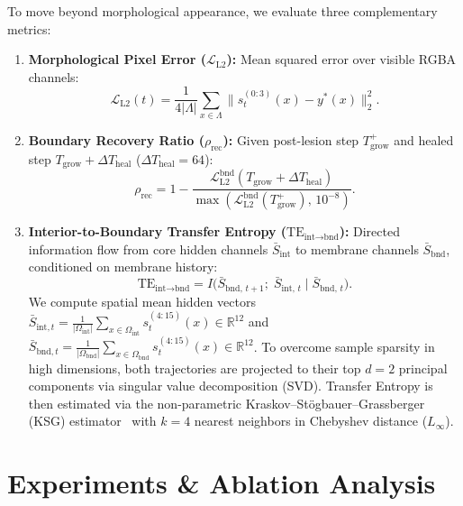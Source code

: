 \documentclass[10pt,twocolumn]{article}
\begin{document}
To move beyond morphological appearance, we evaluate three complementary metrics:
\begin{enumerate}\setlength{\itemsep}{1pt}\setlength{\parskip}{0pt}
    \item \textbf{Morphological Pixel Error ($\mathcal{L}_{\text{L2}}$):} Mean squared error over visible RGBA channels:
    \begin{equation}
    \mathcal{L}_{\text{L2}}(t) = \frac{1}{4 |\Lambda|} \sum_{x \in \Lambda} \| s_t^{(0:3)}(x) - y^*(x) \|_2^2.
    \end{equation}
    \item \textbf{Boundary Recovery Ratio ($\rho_{\text{rec}}$):} Given post-lesion step $T_{\text{grow}}^+$ and healed step $T_{\text{grow}} + \Delta T_{\text{heal}}$ ($\Delta T_{\text{heal}} = 64$):
    \begin{equation}
    \rho_{\text{rec}} = 1 - \frac{\mathcal{L}_{\text{L2}}^{\text{bnd}}(T_{\text{grow}} + \Delta T_{\text{heal}})}{\max\left(\mathcal{L}_{\text{L2}}^{\text{bnd}}(T_{\text{grow}}^+),\, 10^{-8}\right)}.
    \end{equation}
    \item \textbf{Interior-to-Boundary Transfer Entropy ($\text{TE}_{\text{int}\to\text{bnd}}$):} Directed information flow from core hidden channels $\bar{S}_{\text{int}}$ to membrane channels $\bar{S}_{\text{bnd}}$, conditioned on membrane history:
    \begin{equation}
    \text{TE}_{\text{int} \to \text{bnd}} = I\big(\bar{S}_{\text{bnd},\, t+1};\; \bar{S}_{\text{int},\, t} \;\big|\; \bar{S}_{\text{bnd},\, t}\big).
    \end{equation}
    We compute spatial mean hidden vectors $\bar{S}_{\text{int}, t} = \frac{1}{|\Omega_{\text{int}}|} \sum_{x \in \Omega_{\text{int}}} s_t^{(4:15)}(x) \in \mathbb{R}^{12}$ and $\bar{S}_{\text{bnd}, t} = \frac{1}{|\Omega_{\text{bnd}}|} \sum_{x \in \Omega_{\text{bnd}}} s_t^{(4:15)}(x) \in \mathbb{R}^{12}$. To overcome sample sparsity in high dimensions, both trajectories are projected to their top $d=2$ principal components via singular value decomposition (SVD). Transfer Entropy is then estimated via the non-parametric Kraskov--St\"ogbauer--Grassberger (KSG) estimator~\citep{kraskov2004estimating,schreiber2000measuring} with $k=4$ nearest neighbors in Chebyshev distance ($L_\infty$).
\end{enumerate}

\section{Experiments \& Ablation Analysis}
\end{document}
